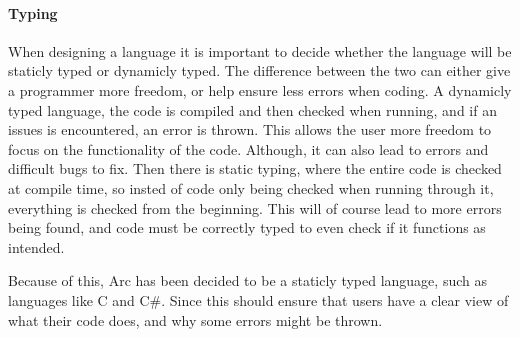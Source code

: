 \paragraph*{Typing}
When designing a language it is important to decide whether the language will be staticly typed or dynamicly typed. The difference between the two can either give a programmer more freedom, or help ensure less errors when coding. A dynamicly typed language, the code is compiled and then checked when running, and if an issues is encountered, an error is thrown. This allows the user more freedom to focus on the functionality of the code. Although, it can also lead to errors and difficult bugs to fix.
Then there is static typing, where the entire code is checked at compile time, so insted of code only being checked when running through it, everything is checked from the beginning. This will of course lead to more errors being found, and code must be correctly typed to even check if it functions as intended. \cite*[]{https://www.techtarget.com/searchapparchitecture/tip/Static-vs-dynamic-typing-The-details-and-differences}

Because of this, Arc has been decided to be a staticly typed language, such as languages like C and C\#. Since this should ensure that users have a clear view of what their code does, and why some errors might be thrown.

